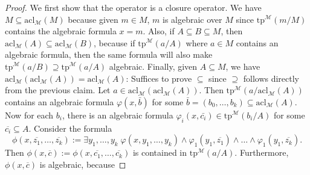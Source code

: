 \documentclass{article}
\begin{document}
\begin{enumerate}[label={\bf Q\arabic*:}]
    \begin{proof}
      We first show that the operator is a closure operator. We have
      $M\subseteq\text{acl}_\mathcal{M}(M)$ because given $m\in M$, $m$ is
      algebraic over $M$ since $\text{tp}^{\mathcal{M}}(m/M)$ contains the
      algebraic formula $x=m$. Also, if $A\subseteq B\subseteq M$, then
      $\text{acl}_\mathcal{M}(A) \subseteq\text{acl}_\mathcal{M}(B)$,
      because if $\text{tp}^{\mathcal{M}}(a/A)$ where $a\in M$ contains an
      algebraic formula, then the same formula will also make
      $\text{tp}^{\mathcal{M}}(a/B) \supseteq\text{tp}^{\mathcal{M}}(a/A)$
      algebraic. Finally, given $A\subseteq M$, we have
      $\text{acl}_\mathcal{M}(\text{acl}_\mathcal{M}(A))
      =\text{acl}_\mathcal{M}(A)$: Suffices to prove $\subseteq$ since
      $\supseteq$ follows directly from the previous claim. Let
      $a\in\text{acl}_\mathcal{M}(\text{acl}_\mathcal{M}(A))$. Then
      $\text{tp}^{\mathcal{M}}(a/\text{acl}_\mathcal{M}(A))$ contains an
      algebraic formula $\varphi(x,\bar{b})$ for some
      $\bar{b}=(b_0,\ldots,b_k)\subseteq \text{acl}_\mathcal{M}(A)$. Now
      for each $b_i$, there is an algebraic formula $\varphi_i(x,\bar{c_i})
      \in\text{tp}^{\mathcal{M}}(b_i/A)$ for some
      $\overline{c_i}\subseteq A$. Consider the formula
      \[\phi(x,\overline{z_1},\ldots,\overline{z_k}) :=\exists
      y_1,\ldots,y_k\; \varphi(x,y_1,\ldots,y_k)
      \wedge\varphi_1(y_1,\overline{z_1})\wedge\ldots
      \wedge\varphi_1(y_1,\overline{z_k}).\] Then $\phi(x,\overline{c}):=
      \phi(x,\overline{c_1},\ldots,\overline{c_k})$ is contained in
      $\text{tp}^{\mathcal{M}}(a/A)$. Furthermore, $\phi(x,\overline{c})$
      is algebraic, because
    \end{proof}
\end{enumerate}
\end{document}
